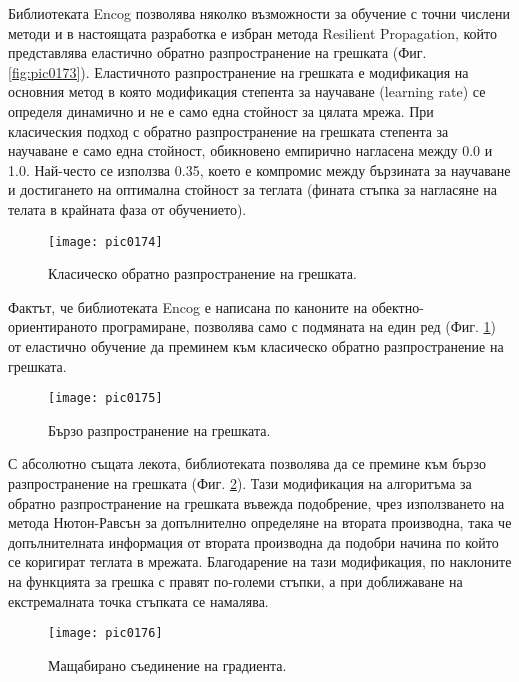 Библиотеката Encog позволява няколко възможности за обучение с точни числени методи и в настоящата разработка е избран метода Resilient Propagation, който представлява еластично обратно разпространение на грешката (Фиг. \ref{fig:pic0173}). Еластичното разпространение на грешката е модификация на основния метод в която модификация степента за научаване (learning rate) се определя динамично и не е само една стойност за цялата мрежа. При класическия подход с обратно разпространение на грешката степента за научаване е само една стойност, обикновено емпирично нагласена между 0.0 и 1.0. Най-често се използва 0.35, което е компромис между бързината за научаване и достигането на оптимална стойност за теглата (фината стъпка за нагласяне на телата в крайната фаза от обучението).

\begin{figure}[h]
  \centering
  \texttt{[image: pic0174]}
  \caption{Класическо обратно разпространение на грешката.}
\label{fig:pic0174}
\end{figure}
\FloatBarrier

Фактът, че библиотеката Encog е написана по каноните на обектно-ориентираното програмиране, позволява само с подмяната на един ред (Фиг. \ref{fig:pic0174}) от еластично обучение да преминем към класическо обратно разпространение на грешката. 

\begin{figure}[h]
  \centering
  \texttt{[image: pic0175]}
  \caption{Бързо разпространение на грешката.}
\label{fig:pic0175}
\end{figure}
\FloatBarrier

С абсолютно същата лекота, библиотеката позволява да се премине към бързо разпространение на грешката (Фиг. \ref{fig:pic0175}). Тази модификация на алгоритъма за обратно разпространение на грешката въвежда подобрение, чрез използването на метода Нютон-Равсън за допълнително определяне на втората производна, така че допълнителната информация от втората производна да подобри начина по който се коригират теглата в мрежата. Благодарение на тази модификация, по наклоните на функцията за грешка с правят по-големи стъпки, а при доближаване на екстремалната точка стъпката се намалява. 

\begin{figure}[h]
  \centering
  \texttt{[image: pic0176]}
  \caption{Мащабирано съединение на градиента.}
\label{fig:pic0176}
\end{figure}
\FloatBarrier


